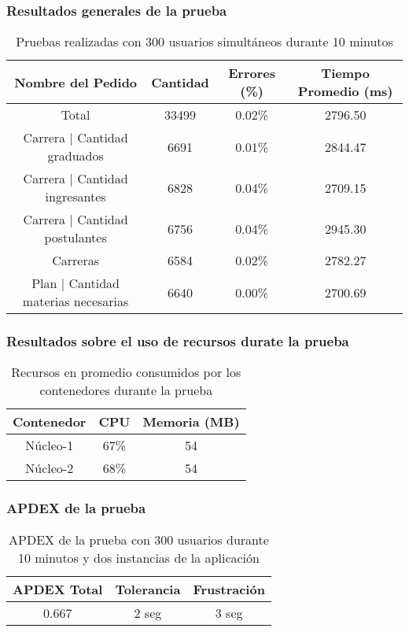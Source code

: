\subsubsection{Resultados generales de la prueba}
\begin{table}[!htbp]
    \centering
    \makegapedcells
    \begin{tabular}{|c|c|c|c|}
    \hline
    Nombre del Pedido & Cantidad & Errores (\%) & Tiempo Promedio (ms) \\ \hline
    Total & 33499 & 0.02\% & 2796.50\\ \hline
    Carrera | Cantidad graduados & 6691 & 0.01\% & 2844.47\\ \hline
    Carrera | Cantidad ingresantes & 6828 & 0.04\% & 2709.15\\ \hline
    Carrera | Cantidad postulantes & 6756 & 0.04\% & 2945.30\\ \hline
    Carreras & 6584 & 0.02\% & 2782.27\\ \hline
    Plan | Cantidad materias necesarias & 6640 & 0.00\% & 2700.69\\ \hline
    \end{tabular}
    \caption{Pruebas realizadas con 300 usuarios simultáneos durante 10 minutos}
    \label{tab:tabla_planes}
\end{table}



\subsubsection{Resultados sobre el uso de recursos durate la prueba}
\begin{table}[!htbp]
    \centering
    \makegapedcells
    \begin{tabular}{|c|c|c|}
    \hline
    Contenedor & CPU & Memoria (MB)\\ \hline
    Núcleo-1 & 67\% & 54 \\ \hline
    Núcleo-2 & 68\% & 54 \\ \hline
    \end{tabular}
    \caption{Recursos en promedio consumidos por los contenedores durante la prueba}
    \label{tab:tabla_planes}
\end{table}
\subsubsection{APDEX de la prueba}
\begin{table}[!htbp]
    \centering
    \makegapedcells
    \begin{tabular}{|c|c|c|}
    \hline
    APDEX Total & Tolerancia & Frustración\\ \hline
    0.667 & 2 seg & 3 seg \\ \hline
    \end{tabular}
    \caption{APDEX de la prueba con 300 usuarios durante 10 minutos y dos instancias de la aplicación}
    \label{tab:tabla_planes}
\end{table}
\break
